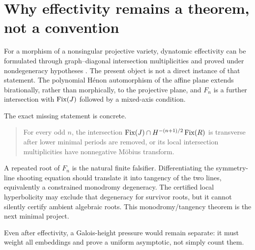 \section{Why effectivity remains a theorem, not a convention}

For a morphism of a nonsingular projective variety, dynatomic effectivity can
be formulated through graph--diagonal intersection multiplicities and proved
under nondegeneracy hypotheses \citep{Hutz2010}.  The present object is not a
direct instance of that statement.  The polynomial H\'enon automorphism of
the affine plane extends birationally, rather than morphically, to the
projective plane, and $F_n$ is a further intersection with $\operatorname{Fix}(J)$ followed
by a mixed-axis condition.

The exact missing statement is concrete.

\begin{quote}
For every odd $n$, the intersection
$\operatorname{Fix}(J)\cap H^{-(n+1)/2}\operatorname{Fix}(R)$ is transverse after lower minimal periods
are removed, or its local intersection multiplicities have nonnegative
M\"obius transform.
\end{quote}

A repeated root of $F_n$ is the natural finite falsifier.  Differentiating the
symmetry-line shooting equation should translate it into tangency of the two
lines, equivalently a constrained monodromy degeneracy.  The certified local
hyperbolicity may exclude that degeneracy for survivor roots, but it cannot
silently certify ambient algebraic roots.  This monodromy/tangency theorem is
the next minimal project.

Even after effectivity, a Galois-height pressure would remain separate: it
must weight all embeddings and prove a uniform asymptotic, not simply count
them.
